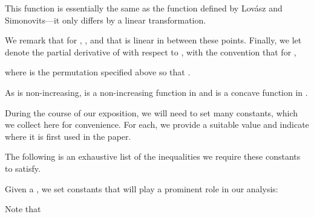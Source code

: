 \documentclass[11pt]{article}
\begin{document}
This function  is essentially the same as the function 
  defined by Lov\'asz and Simonovits---it only differs by a linear transformation.


We remark that for ,
  , and that
   is linear in  between these points.
Finally, we let  denote the partial derivative of
   with respect to , with the convention that for
  ,

where  is the permutation specified above
  so that .

As  is non-increasing,
   is a non-increasing function in  and
   is a concave function in .

During the course of our exposition, we will need to set many constants,
  which we collect here for convenience.
For each, we provide a suitable value and indicate where it is first used in the paper. 

The following is an exhaustive list of the inequalities 
  we require these constants to satisfy.


Given a , we set constants that will play a prominent role in our analysis:

Note that


\vskip 0.2in
\noindent
{}
\vskip 0.2in
\end{document}
